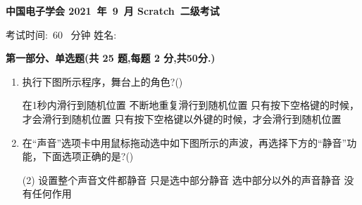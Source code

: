 \documentclass[10pt, a4paper]{article}
\newcommand{\Title}[3]{
    \begin{center}
        \Large \textbf{中国电子学会 #1~年~#2~月 Scratch~#3级考试}
    \end{center}
}
\newcommand{\TimeAndName}[1]{
    \begin{center}
        考试时间:~#1~ 分钟 \qquad\qquad\qquad\qquad 姓名:\underline{\quad\quad\quad\quad}
    \end{center}
}
\begin{document}
    \Title{2021}{9}{二} %
    \TimeAndName{60} %

    \vspace{2mm}
    {\noindent\textbf{第一部分、单选题(共 25 题,每题 2 分,共50分.)}}
    \begin{enumerate}
        \item 执行下图所示程序，舞台上的角色?(\qquad)
        \begin{tasks}
            \task 在1秒内滑行到随机位置
            \task 不断地重复滑行到随机位置
            \task 只有按下空格键的时候，才会滑行到随机位置
            \task 只有按下空格键以外键的时候，才会滑行到随机位置
        \end{tasks}

        \item 在“声音”选项卡中用鼠标拖动选中如下图所示的声波，再选择下方的“静音”功能，下面选项正确的是?(\qquad)
        \begin{tasks}(2)
            \task 设置整个声音文件都静音
            \task 只是选中部分静音
            \task 选中部分以外的声音静音
            \task 没有任何作用
        \end{tasks}


\end{enumerate}
\end{document}
